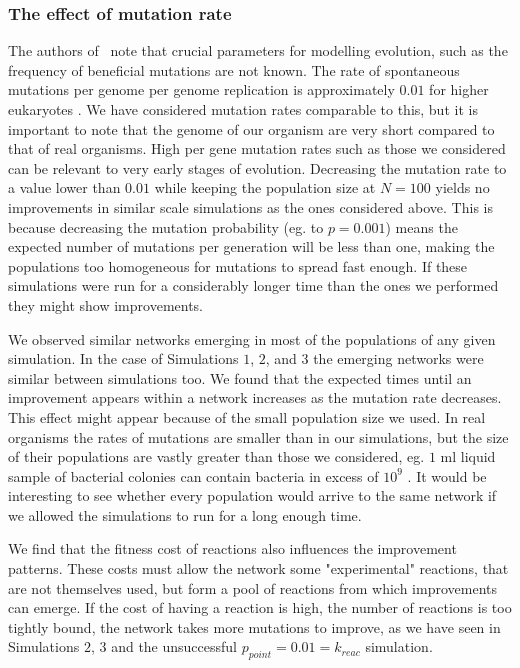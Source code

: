 \documentclass[a4paper,12pt]{article}
\begin{document}
\subsubsection*{The effect of mutation rate}
\label{sub:on_the_effect_of_the_probability_of_mutation}


The authors of \cite{predictability}~note that crucial parameters for modelling evolution, such as the frequency of beneficial mutations are not known. The rate of spontaneous mutations per genome per genome replication is approximately $0.01$ for higher eukaryotes \cite{mutationrate}. We have considered mutation rates comparable to this, but it is important to note that the genome of our organism are very short compared to that of real organisms. High per gene mutation rates such as those we considered can be relevant to very early stages of evolution. Decreasing the mutation rate to a value lower than $0.01$ while keeping the population size at $N=100$ yields no improvements in similar scale simulations as the ones considered above. This is because decreasing the mutation probability (eg. to $p=0.001$) means the expected number of mutations per generation will be less than one, making the populations too homogeneous for mutations to spread fast enough. If these simulations were run for a considerably longer time than the ones we performed they might show improvements. 

We observed similar networks emerging in most of the populations of any given simulation. In the case of Simulations $1$, $2$, and $3$ the emerging networks were similar between simulations too. We found that the expected times until an improvement appears within a network increases as the mutation rate decreases. This effect might appear because of the small population size we used. In real organisms the rates of mutations are smaller than in our simulations, but the size of their populations are vastly greater than those we considered, eg. $1$ ml liquid sample of bacterial colonies can contain bacteria in excess of $10^9$ \cite{barteklecture}. It would be interesting to see whether every population would arrive to the same network if we allowed the simulations to run for a long enough time.

We find that the fitness cost of reactions also influences the improvement patterns. These costs must allow the network some "experimental" reactions, that are not themselves used, but form a pool of reactions from which improvements can emerge. If the cost of having a reaction is high, the number of reactions is too tightly bound, the network takes more mutations to improve, as we have seen in Simulations $2$, $3$ and the unsuccessful $p_{point}=0.01=k_{reac}$ simulation.
\end{document}
